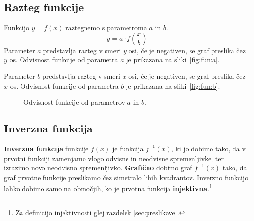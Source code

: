 \documentclass[a4paper,oneside,12pt,fleqn]{article}
\newcommand\krat\cdot
\newcommand{\beforecaptionskip}{\vspace{-12pt}}
\numberwithin{equation}{section}
\begin{document}
\subsection{Razteg funkcije}
\label{sec:fun:razt}
Funkcijo $y = f(x)$ raztegnemo s parametroma $a$ in $b$.
\[ y = a \krat f\left( \frac{x}{b} \right) \]
Parameter $a$ predstavlja razteg v smeri $y$ osi, če je negativen, se graf preslika čez
$y$ os. Odvisnost funkcije od parametra $a$ je prikazana na sliki~\ref{fig:fun:a}. 

Parameter $b$ predstavlja razteg v smeri $x$ osi, če je negativen, se graf
preslika čez $x$ os. Odvisnost funkcije od parametra $b$ je prikazana na sliki~\ref{fig:fun:b}. 

\begin{figure}[ht]
  \begin{center}
  \end{center}
  \beforecaptionskip
  \caption{Odvisnost funkcije od parametrov $a$ in $b$.}
  \label{fig:fun:ab}
\end{figure}

\subsection{Inverzna funkcija}
\label{sec:fun:inv}
\textbf{Inverzna funkcija} funkcije $f(x)$ je funkcija $f^{-1}(x)$, ki jo dobimo tako, da v prvotni
funkciji zamenjamo vlogo odvisne in neodvisne spremenljivke, ter izrazimo novo neodvisno
spremenljivko. \textbf{Grafično} dobimo graf $f^{-1}(x)$ tako, da graf prvotne funkcije preslikamo
čez simetralo lihih kvadrantov. Inverzno funkcijo lahko dobimo samo na območjih, ko je
prvotna funkcija \textbf{injektivna}.\footnote{Za definicijo injektivnosti glej razdelek
\ref{sec:preslikave}.}
\end{document}
